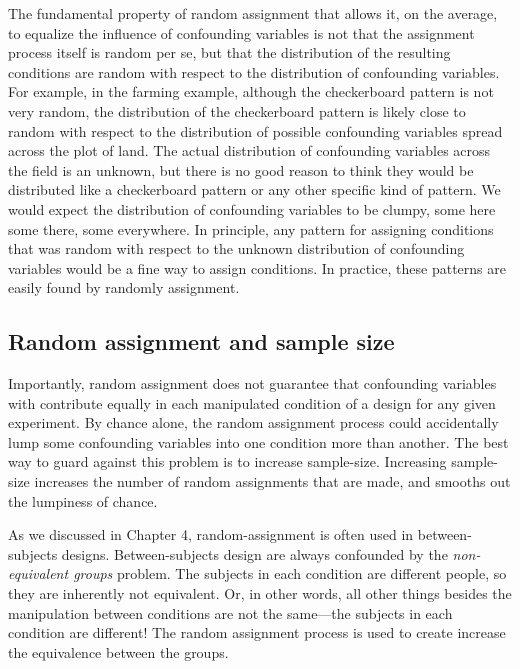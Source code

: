 The fundamental property of random assignment that allows it, on the average, to equalize the influence of confounding variables is not that the assignment process itself is random per se, but that the distribution of the resulting conditions are random with respect to the distribution of confounding variables. For example, in the farming example, although the checkerboard pattern is not very random, the distribution of the checkerboard pattern is likely close  to random with respect to the distribution of possible confounding variables spread across the plot of land. The actual distribution of confounding variables across the field is an unknown, but there is no good reason to think they would be distributed like a checkerboard pattern or any other specific kind of pattern. We would expect the distribution of confounding variables to be clumpy, some here some there, some everywhere. In principle, any pattern for assigning conditions that was random with respect to the unknown distribution of confounding variables would be a fine way to assign conditions. In practice, these patterns are easily found by randomly assignment.

\subsection{Random assignment and sample size}

Importantly, random assignment does not guarantee that confounding variables with contribute equally in each manipulated condition of a design for any given experiment. By chance alone, the random assignment process could accidentally lump some confounding variables into one condition more than another. The best way to guard against this problem is to increase sample-size. Increasing sample-size increases the number of random assignments that are made, and smooths out the lumpiness of chance.

As we discussed in Chapter 4, random-assignment is often used in between-subjects designs. Between-subjects design are always confounded by the \emph{non-equivalent groups} problem. The subjects in each condition are different people, so they are inherently not equivalent. Or, in other words, all other things besides the manipulation between conditions are not the same---the subjects in each condition are different! The random assignment process is used to create increase the equivalence between the groups.

